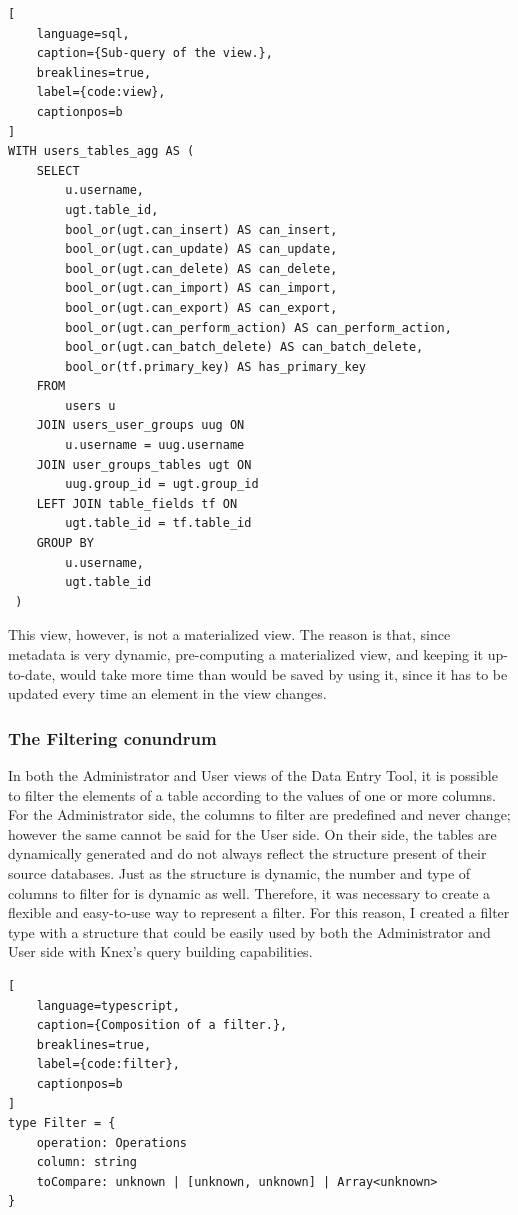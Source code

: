 \begin{lstlisting}[ 
    language=sql,
    caption={Sub-query of the view.},
    breaklines=true,
    label={code:view},
    captionpos=b
]
WITH users_tables_agg AS (
    SELECT
        u.username,
        ugt.table_id,
        bool_or(ugt.can_insert) AS can_insert,
        bool_or(ugt.can_update) AS can_update,
        bool_or(ugt.can_delete) AS can_delete,
        bool_or(ugt.can_import) AS can_import,
        bool_or(ugt.can_export) AS can_export,
        bool_or(ugt.can_perform_action) AS can_perform_action,
        bool_or(ugt.can_batch_delete) AS can_batch_delete,
        bool_or(tf.primary_key) AS has_primary_key
    FROM
        users u
    JOIN users_user_groups uug ON
        u.username = uug.username
    JOIN user_groups_tables ugt ON
        uug.group_id = ugt.group_id
    LEFT JOIN table_fields tf ON 
        ugt.table_id = tf.table_id 
    GROUP BY
        u.username,
        ugt.table_id
 )
\end{lstlisting}

This view, however, is not a materialized view. The reason is that, since metadata is very dynamic, pre-computing a materialized view, and keeping it up-to-date, would take more time than would be saved by using it, since it has to be updated every time an element in the view changes.

\subsubsection{The Filtering conundrum} 
In both the Administrator and User views of the Data Entry Tool, it is possible to filter the elements of a table according to the values of one or more columns. For the Administrator side, the columns to filter are predefined and never change; however the same cannot be said for the User side. On their side, the tables are dynamically generated and do not always reflect the structure present of their source databases. Just as the structure is dynamic, the number and type of columns to filter for is dynamic as well. Therefore, it was necessary to create a flexible and easy-to-use way to represent a filter. For this reason, I created a filter type with a structure that could be easily used by both the Administrator and User side with Knex's query building capabilities.

\begin{lstlisting}[ 
    language=typescript,
    caption={Composition of a filter.},
    breaklines=true,
    label={code:filter},
    captionpos=b
]
type Filter = {
    operation: Operations
    column: string
    toCompare: unknown | [unknown, unknown] | Array<unknown>
}
\end{lstlisting}

